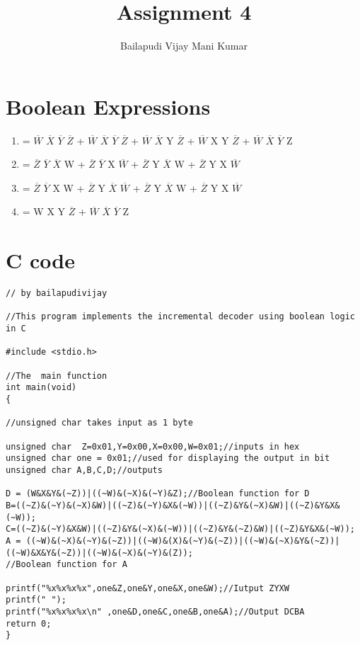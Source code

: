\documentclass{article}
\title{Assignment 4}
\author{Bailapudi Vijay Mani Kumar}
\begin{document}
\maketitle

\section{Boolean Expressions}
\begin{enumerate}[label=(\Alph*)]
    \item = $\overline{W}$ $\overline{X}$ $\overline{Y}$ $\overline{Z}$ + $\overline{W}$ $\overline{X}$ $\overline{Y}$ $\overline{Z}$ + $\overline{W}$ $\overline{X}$ Y $\overline{Z}$ + $\overline{W}$ X Y $\overline{Z}$ + $\overline{W}$ $\overline{X}$ $\overline{Y}$ Z
    \item = $\overline{Z}$ $\overline{Y}$ $\overline{X}$ W + $\overline{Z}$ $\overline{Y}$ X $\overline{W}$ + $\overline{Z}$ Y $\overline{X}$ W + $\overline{Z}$ Y X $\overline{W}$
    \item = $\overline{Z}$ $\overline{Y}$ X W + $\overline{Z}$ Y $\overline{X}$ $\overline{W}$ + $\overline{Z}$ Y $\overline{X}$ W + $\overline{Z}$ Y X $\overline{W}$
    \item = W X Y $\overline{Z}$ + $\overline{W}$ $\overline{X}$ $\overline{Y}$ Z
\end{enumerate}

\section{C code}
\begin{lstlisting}[style=CStyle]
// by bailapudivijay

//This program implements the incremental decoder using boolean logic in C

#include <stdio.h>

//The  main function
int main(void)
{

//unsigned char takes input as 1 byte

unsigned char  Z=0x01,Y=0x00,X=0x00,W=0x01;//inputs in hex	
unsigned char one = 0x01;//used for displaying the output in bit
unsigned char A,B,C,D;//outputs

D = (W&X&Y&(~Z))|((~W)&(~X)&(~Y)&Z);//Boolean function for D
B=((~Z)&(~Y)&(~X)&W)|((~Z)&(~Y)&X&(~W))|((~Z)&Y&(~X)&W)|((~Z)&Y&X&(~W));
C=((~Z)&(~Y)&X&W)|((~Z)&Y&(~X)&(~W))|((~Z)&Y&(~Z)&W)|((~Z)&Y&X&(~W));
A = ((~W)&(~X)&(~Y)&(~Z))|((~W)&(X)&(~Y)&(~Z))|((~W)&(~X)&Y&(~Z))|((~W)&X&Y&(~Z))|((~W)&(~X)&(~Y)&(Z));
//Boolean function for A

printf("%x%x%x%x",one&Z,one&Y,one&X,one&W);//Iutput ZYXW
printf(" ");
printf("%x%x%x%x\n" ,one&D,one&C,one&B,one&A);//Output DCBA
return 0;
}

\end{lstlisting}
\end{document}
